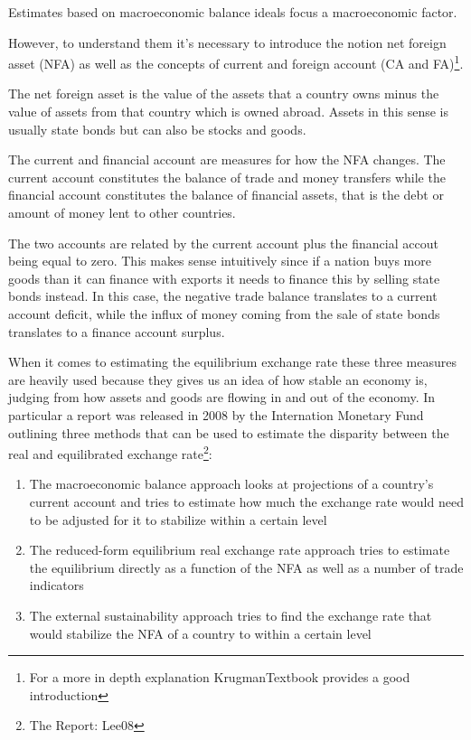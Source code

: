 Estimates based on macroeconomic balance ideals focus a macroeconomic factor. 

However, to understand 
them it's necessary to introduce the notion net foreign asset (NFA) as 
well as the concepts of current and foreign account (CA and 
FA)\footnote{For a more in depth explanation \cite{ch.  
18}{KrugmanTextbook} provides a good introduction}.

The net foreign asset is the value of the assets that a country owns 
minus the value of assets from that country which is owned abroad.  
Assets in this sense is usually state bonds but can also be stocks and 
goods.  

The current and financial account are measures for how the NFA changes.  
The current account constitutes the balance of trade and money transfers 
while the financial account constitutes the balance of financial assets, 
that is the debt or amount of money lent to other countries. 

The two accounts are related by the current account plus the financial 
accout being equal to zero. This makes sense intuitively since if a 
nation buys more goods than it can finance with exports it needs to 
finance this by selling state bonds instead. In this case, the negative 
trade balance translates to a current account deficit, while the influx 
of money coming from the sale of state bonds translates to a finance 
account surplus.

When it comes to estimating the equilibrium exchange rate these three 
measures are heavily used because they gives us an idea of how stable an 
economy is, judging from how assets and goods are flowing in and out of 
the economy. In particular a report was released in 2008 by the 
Internation Monetary Fund outlining three methods that can be used to 
estimate the disparity between the real and equilibrated exchange 
rate\footnote{The Report: \cite{pp.  1}{Lee08}}:

\begin{enumerate}
\item{The macroeconomic balance approach looks at projections of a 
	country's current account and tries to estimate how much the 
exchange rate would need to be adjusted for it to stabilize within a 
certain level}
\item{The reduced-form equilibrium real exchange rate approach tries to 
	estimate the equilibrium directly as a function of the NFA as well 
as a number of trade indicators}
\item{The external sustainability approach tries to find the exchange 
	rate that would stabilize the NFA of a country to within a certain 
level}
\end{enumerate}


